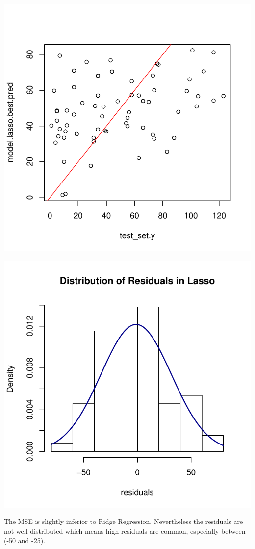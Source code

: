 \documentclass[]{report}
\begin{document}
\begin{center}
	\includegraphics[width=0.8\linewidth]{Figures/lasso_predicted.pdf}
\end{center}

\begin{center}
	\includegraphics[width=0.8\linewidth]{Figures/lasso_residuals.pdf}
\end{center}

The MSE is slightly inferior to Ridge Regression. Nevertheless the residuals are not well distributed which means high residuals are common, especially between (-50 and -25).
\end{document}
